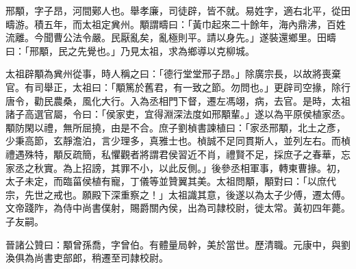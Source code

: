 
\begin{pinyinscope}
邢顒，字子昂，河間鄚人也。舉孝廉，司徒辟，皆不就。易姓字，適右北平，從田疇游。積五年，而太祖定兾州。顒謂疇曰：「黃巾起來二十餘年，海內鼎沸，百姓流離。今聞曹公法令嚴。民厭亂矣，亂極則平。請以身先。」遂裝還鄉里。田疇曰：「邢顒，民之先覺也。」乃見太祖，求為鄉導以克柳城。

太祖辟顒為兾州從事，時人稱之曰：「德行堂堂邢子昂。」除廣宗長，以故將喪棄官。有司舉正，太祖曰：「顒篤於舊君，有一致之節。勿問也。」更辟司空掾，除行唐令，勸民農桑，風化大行。入為丞相門下督，遷左馮翊，病，去官。是時，太祖諸子高選官屬，令曰：「侯家吏，宜得淵深法度如邢顒輩。」遂以為平原侯植家丞。顒防閑以禮，無所屈撓，由是不合。庶子劉楨書諫植曰：「家丞邢顒，北土之彥，少秉高節，玄靜澹泊，言少理多，真雅士也。楨誠不足同貫斯人，並列左右。而楨禮遇殊特，顒反疏簡，私懼觀者將謂君侯習近不肖，禮賢不足，採庶子之春華，忘家丞之秋實。為上招謗，其罪不小，以此反側。」後參丞相軍事，轉東曹掾。初，太子未定，而臨菑侯植有寵，丁儀等並贊翼其美。太祖問顒，顒對曰：「以庶代宗，先世之戒也。願殿下深重察之！」太祖識其意，後遂以為太子少傅，遷太傅。文帝踐阼，為侍中尚書僕射，賜爵關內侯，出為司隷校尉，徙太常。黃初四年薨。子友嗣。

晉諸公贊曰：顒曾孫喬，字曾伯。有體量局幹，美於當世。歷清職。元康中，與劉渙俱為尚書吏部郎，稍遷至司隷校尉。


\end{pinyinscope}